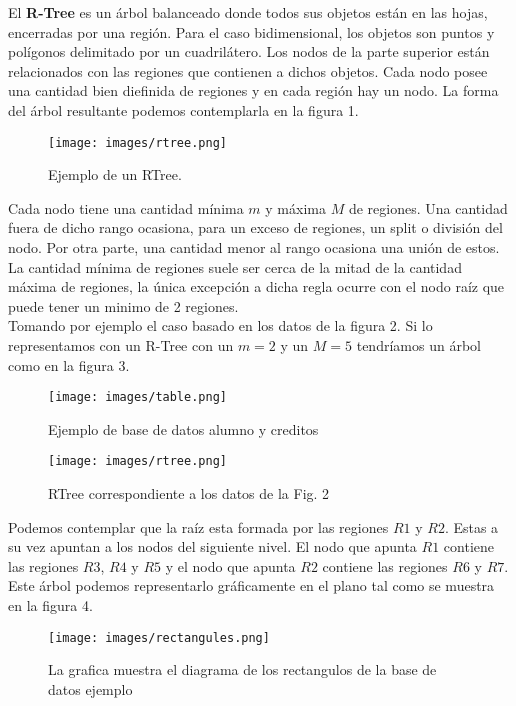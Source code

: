 \documentclass[12pt]{article}
\begin{document}
El \textbf{R-Tree} es un árbol balanceado donde todos sus objetos están en las hojas, encerradas por una región. Para el caso bidimensional, los objetos son puntos y polígonos delimitado por un cuadrilátero. Los nodos de la parte superior están relacionados con las regiones que contienen a dichos objetos. Cada nodo posee una cantidad bien diefinida de regiones y en cada región hay un nodo. La forma del árbol resultante podemos contemplarla en la figura 1.\\

\begin{figure}[!h]
\centering
\texttt{[image: images/rtree.png]}
\centering
\caption{Ejemplo de un RTree.}
\end{figure}

Cada nodo tiene una cantidad mínima $m$ y máxima $M$ de regiones. Una cantidad fuera de dicho rango ocasiona, para un exceso de regiones, un split o división del nodo. Por otra parte, una cantidad menor al rango ocasiona una unión de estos. La cantidad mínima de regiones suele ser cerca de la mitad de la cantidad máxima de regiones, la única excepción a dicha regla ocurre con el nodo raíz que puede tener un minimo de 2 regiones.\\

Tomando por ejemplo el caso basado en los datos de la figura 2. Si lo representamos con un R-Tree con un $m=2$ y un $M=5$
tendríamos un árbol como en la figura 3.

\begin{figure}[!h]
\centering
\texttt{[image: images/table.png]}
\centering
\caption{Ejemplo de base de datos alumno y creditos}
\end{figure}


\begin{figure}[!h]
\centering
\texttt{[image: images/rtree.png]}
\centering
\caption{RTree correspondiente a los datos de la Fig. 2}
\end{figure}

Podemos contemplar que la raíz esta formada por las regiones $R1$ y $R2$. Estas a su vez apuntan a los nodos del siguiente nivel. El nodo que apunta $R1$ contiene las regiones $R3$, $R4$ y $R5$ y el nodo que apunta $R2$ contiene las regiones $R6$ y $R7$. Este árbol podemos representarlo gráficamente en el plano tal como se muestra en la figura 4.


\begin{figure}[!h]
\centering
\texttt{[image: images/rectangules.png]}
\centering
\caption{La grafica muestra el diagrama de los rectangulos de la base de datos ejemplo}
\end{figure}
\end{document}

